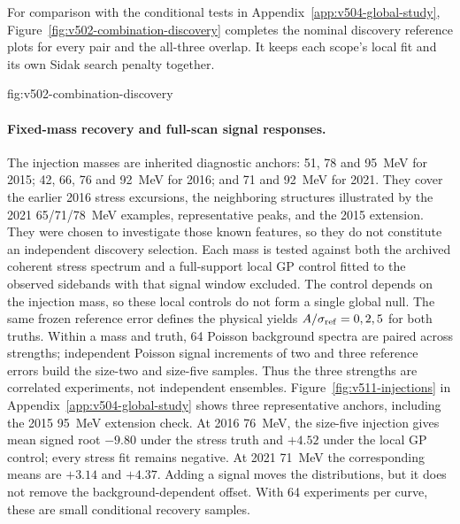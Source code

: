 For comparison with the conditional tests in Appendix~\ref{app:v504-global-study},
Figure~\ref{fig:v502-combination-discovery} completes the nominal discovery
reference plots for every pair and the all-three overlap. It keeps each
scope's local fit and its own Sidak search penalty together.

{fig:v502-combination-discovery}
\FloatBarrier

\paragraph{Fixed-mass recovery and full-scan signal responses.}
The injection masses are inherited diagnostic anchors: 51, 78 and 95~MeV
for 2015; 42, 66, 76 and 92~MeV for 2016; and 71 and 92~MeV for 2021.
They cover the earlier 2016 stress excursions, the neighboring structures
illustrated by the 2021 65/71/78~MeV examples, representative peaks, and
the 2015 extension. They were chosen to investigate those known
features, so they do not constitute an independent discovery selection.
Each mass is tested against both the archived coherent stress spectrum
and a full-support local GP control fitted to the observed sidebands
with that signal window excluded. The control depends on the injection
mass, so these local controls do not form a single global null. The same frozen reference
error defines the physical yields $A/\sigma_{\rm ref}=0,2,5$ for both
truths. Within a mass and truth, 64 Poisson background spectra are paired
across strengths; independent Poisson signal increments of two and three
reference errors build the size-two and size-five samples. Thus the
three strengths are correlated experiments, not independent ensembles.
Figure~\ref{fig:v511-injections} in Appendix~\ref{app:v504-global-study}
shows three representative anchors, including the 2015 95~MeV extension check.
At 2016 76~MeV, the size-five injection gives mean signed root $-9.80$
under the stress truth and $+4.52$ under the local GP control; every
stress fit remains negative. At 2021 71~MeV the corresponding means are
$+3.14$ and $+4.37$. Adding a signal moves the distributions, but it does
not remove the background-dependent offset. With 64 experiments per
curve, these are small conditional recovery samples.


